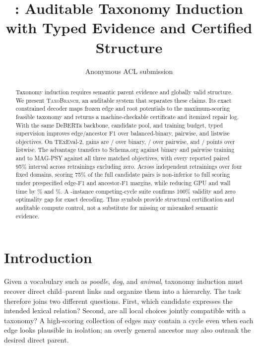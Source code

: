 \documentclass[11pt]{article}
\title{\method: Auditable Taxonomy Induction\\with Typed Evidence and Certified Structure}
\author{Anonymous ACL submission}
\newcommand{\method}{\textsc{TaxoBranch}}
\begin{document}
\maketitle

\begin{abstract}
Taxonomy induction requires semantic parent evidence and globally valid
structure. We present \method, an auditable system that separates these claims.
Its exact constrained decoder maps frozen edge and root potentials to the
maximum-scoring feasible taxonomy and returns a machine-checkable certificate
and itemized repair log. With the same DeBERTa backbone, candidate pool, and
training budget, typed supervision improves edge/ancestor F1 over
balanced-binary, pairwise, and listwise objectives. On TExEval-2, gains are
\MatchedObjectiveTexevalTypedMinusBinaryEdge/\MatchedObjectiveTexevalTypedMinusBinaryAncestor{} over binary,
\MatchedObjectiveTexevalTypedMinusPairwiseEdge/\MatchedObjectiveTexevalTypedMinusPairwiseAncestor{} over pairwise, and
\MatchedObjectiveTexevalTypedMinusListwiseEdge/\MatchedObjectiveTexevalTypedMinusListwiseAncestor{} points over listwise.
The advantage transfers to Schema.org against binary and pairwise training and
to MAG-PSY against all three matched objectives, with every reported
paired 95\% interval across retrainings excluding zero. Across \NISeeds{} independent retrainings over four fixed
domains, scoring 75\% of the full candidate pairs is non-inferior to full scoring under prespecified
\NIEdgeMargin{} edge-F1 and \NIAncestorMargin{} ancestor-F1 margins, while
reducing GPU and wall time by \NIGPUSaving\% and \NIWallSaving\%. A
\PressureRuns{}-instance competing-cycle suite confirms 100\% validity and zero
optimality gap for exact decoding. Thus symbols provide structural
certification and auditable compute control, not a substitute for missing or
misranked semantic evidence.
\end{abstract}

\section{Introduction}

Given a vocabulary such as \emph{poodle}, \emph{dog}, and \emph{animal},
taxonomy induction must recover direct child--parent links and organize them
into a hierarchy.  The task therefore joins two different questions.  First,
which candidate expresses the intended lexical relation?  Second, are all
local choices jointly compatible with a taxonomy?  A high-scoring collection
of edges may contain a cycle even when each edge looks plausible in isolation;
an overly general ancestor may also outrank the desired direct parent.
\end{document}
